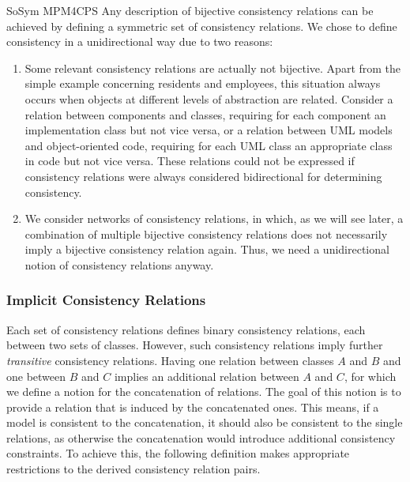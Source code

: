\begin{copiedFrom}{SoSym MPM4CPS}
Any description of bijective consistency relations can be achieved by defining a symmetric set of consistency relations.
We chose to define consistency in a unidirectional way due to two reasons:
\begin{enumerate}
    \item Some relevant consistency relations are actually not bijective. 
    Apart from the simple example concerning residents and employees, this situation always occurs when objects at different levels of abstraction are related.
    Consider a relation between components and classes, requiring for each component an implementation class but not vice versa, or a relation between UML models and object-oriented code, requiring for each UML class an appropriate class in code but not vice versa.
    These relations could not be expressed if consistency relations were always considered bidirectional for determining consistency.
    \item We consider networks of consistency relations, in which, as we will see later, a combination of multiple bijective consistency relations does not necessarily imply a bijective consistency relation again. 
    Thus, we need a unidirectional notion of consistency relations anyway.
\end{enumerate}


\subsubsection{Implicit Consistency Relations}

Each set of consistency relations defines binary consistency relations, each between two sets of classes.
However, such consistency relations imply further \emph{transitive} consistency relations.
Having one relation between classes $A$ and $B$ and one between $B$ and $C$ implies an additional relation between $A$ and $C$, for which we define a notion for the concatenation of relations.
The goal of this notion is to provide a relation that is induced by the concatenated ones. This means, if a model is consistent to the concatenation, it should also be consistent to the single relations, as otherwise the concatenation would introduce additional consistency constraints.
To achieve this, the following definition makes appropriate restrictions to the derived consistency relation pairs.


\end{copiedFrom}
